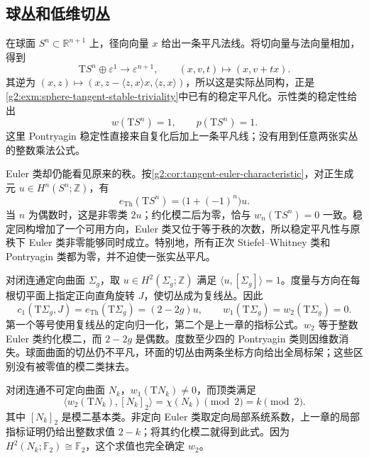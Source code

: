 \subsection{球丛和低维切丛}
\label{g2:subsec:2104:02}
在球面 \(S^n\subset\mathbb R^{n+1}\) 上，径向向量 \(x\) 给出一条平凡法线。将切向量与法向量相加，得到
\begin{equation}\label{g2:eq:sphere-stable-tangent-characteristic}
	\mathrm TS^n\oplus\varepsilon^1\longrightarrow\varepsilon^{n+1},
	\qquad(x,v,t)\longmapsto(x,v+tx).
\end{equation}
其逆为 \((x,z)\mapsto(x,z-\langle z,x\rangle x,\langle z,x\rangle)\)，所以这是实际丛同构，正是\cref{g2:exm:sphere-tangent-stable-triviality}中已有的稳定平凡化。示性类的稳定性给出
\[
	w(\mathrm TS^n)=1,\qquad p(\mathrm TS^n)=1.
\]
这里 Pontryagin 稳定性直接来自复化后加上一条平凡线；没有用到任意两张实丛的整数乘法公式。

\ProseParagraphBreak

Euler 类却仍能看见原来的秩。按\cref{g2:cor:tangent-euler-characteristic}，对正生成元 \(u\in H^n(S^n;\mathbb Z)\)，有
\[
	e_{\mathrm{Th}}(\mathrm TS^n)=\bigl(1+(-1)^n\bigr)u.
\]
当 \(n\) 为偶数时，这是非零类 \(2u\)；约化模二后为零，恰与 \(w_n(\mathrm TS^n)=0\) 一致。稳定同构增加了一个可用方向，Euler 类又位于等于秩的次数，所以稳定平凡性与原秩下 Euler 类非零能够同时成立。特别地，所有正次 Stiefel--Whitney 类和 Pontryagin 类都为零，并不迫使一张实丛平凡。

\begin{example}\label{g2:exm:surface-characteristic-classes}
	对闭连通定向曲面 \(\Sigma_g\)，取 \(u\in H^2(\Sigma_g;\mathbb Z)\) 满足 \(\langle u,[\Sigma_g]\rangle=1\)。度量与方向在每根切平面上指定正向直角旋转 \(J\)，使切丛成为复线丛。因此
	\[
		c_1(\mathrm T\Sigma_g,J)=e_{\mathrm{Th}}(\mathrm T\Sigma_g)=(2-2g)u,
		\qquad w_1(\mathrm T\Sigma_g)=w_2(\mathrm T\Sigma_g)=0.
	\]
	第一个等号使用复线丛的定向归一化，第二个是上一章的指标公式。\(w_2\) 等于整数 Euler 类约化模二，而 \(2-2g\) 是偶数。度数至少四的 Pontryagin 类则因维数消失。球面曲面的切丛仍不平凡，环面的切丛由两条坐标方向给出全局标架；这些区别没有被零值的模二类抹去。

	对闭连通不可定向曲面 \(N_k\)，\(w_1(\mathrm TN_k)\ne0\)，而顶类满足
	\[
		\langle w_2(\mathrm TN_k),[N_k]_2\rangle
		=\chi(N_k)\pmod2=k\pmod2.
	\]
	其中 \([N_k]_2\) 是模二基本类。非定向 Euler 类取定向局部系统系数，上一章的局部指标证明仍给出整数求值 \(2-k\)；将其约化模二就得到此式。因为 \(H^2(N_k;\mathbb F_2)\cong\mathbb F_2\)，这个求值也完全确定 \(w_2\)。
\end{example}

